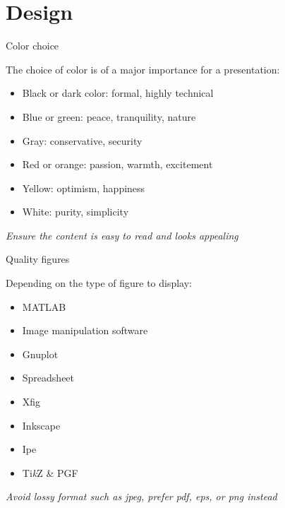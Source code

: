 \section{Design}

\begin{frame}{Color choice}

The choice of color is of a major importance for a presentation:
\begin{itemize}
	\item Black or dark color: formal, highly technical
	\item Blue or green: peace, tranquility, nature
	\item Gray: conservative, security
	\item Red or orange: passion, warmth, excitement 
	\item Yellow: optimism, happiness
	\item White: purity, simplicity
\end{itemize}
\pause\medskip

\centering 
{\em Ensure the content is easy to read and looks appealing}

\end{frame}

\begin{frame}{Quality figures}

	Depending on the type of figure to display:
	\begin{multicols}{2}
		\begin{itemize}\bigsep
			\item MATLAB
			\item Image manipulation software 
			\item Gnuplot
			\item Spreadsheet 
		\columnbreak
			\item Xfig
			\item Inkscape
			\item Ipe
			\item Ti{\em k}Z \& PGF
		\end{itemize}
	\end{multicols}
	\bigskip

	\centering
	{\em Avoid lossy format such as jpeg, prefer pdf, eps, or png instead}

\end{frame}

